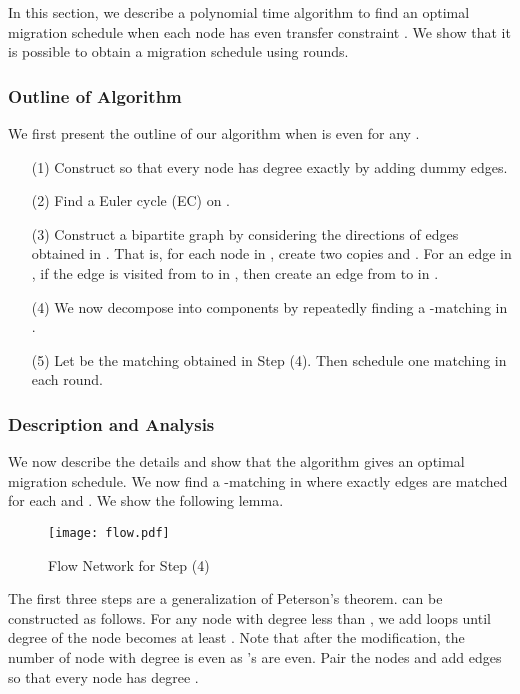 \documentclass[titlepage, 11pt]{article}
\begin{document}
In this section, we describe a polynomial time algorithm to find an optimal migration
schedule when each node  has even transfer constraint . We show that it is possible to obtain a migration schedule using  rounds.

\subsubsection{Outline of Algorithm}
We first present the outline of our algorithm when  is even for any .

\begin{enumerate}
\item[(1)] Construct  so that every node has degree exactly    
by adding dummy edges.
\item[(2)] Find a Euler cycle (EC) on . 
\item[(3)] Construct a bipartite graph  by considering the directions of edges
obtained in . That is, for each node  in , create two copies 
and . For an edge  in , if the edge is visited
from  to  in , then create an edge from  to  in .
\item[(4)] We now decompose  into  components
by repeatedly finding a -matching in . 
\item[(5)] Let  be the matching
obtained in Step (4). Then schedule one matching in each round.
\end{enumerate}


\subsubsection{Description and Analysis}\label{sec:detail_even}
We now describe the details and show that
the algorithm gives an optimal migration schedule.
\vspace{0.1in}
We now find a -matching in   where exactly  edges are matched for each 
and . We show the following lemma.
\begin{figure}[h]
\centering
\texttt{[image: flow.pdf]}
\caption{Flow Network for Step (4)}
\label{fig:flow}
\end{figure}
\vspace{0.1in}

\vspace{0.1in}
The first three steps  are a generalization of
Peterson's theorem.  can be constructed as follows.
For any node  with degree less than , we add
loops until degree of the node becomes at least .
Note that after the modification, the number of node with degree 
 is even as 's are even. Pair the nodes and add edges 
so that every node has degree .
\end{document}
